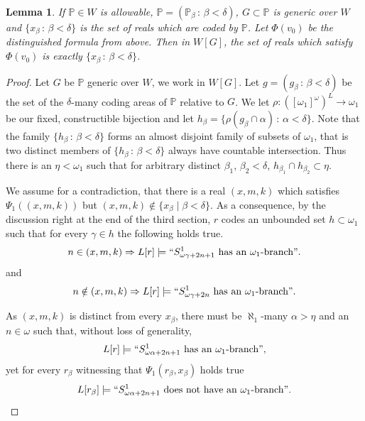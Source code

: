 \documentclass[a4paper,11pt]{article}
\newtheorem{lemma}[theorem]{Lemma}
\newcommand{\forceP}{\mathbb{P}}
\begin{document}
\begin{lemma}\label{nounwantedcodes}
If $\forceP \in W$ is allowable, $\forceP=(\forceP_{\beta} \, : \, \beta < \delta)$, $G \subset \forceP$ is generic over $W$ and $\{ x_{\beta} \, : \, \beta < \delta\}$ is the set of reals which are coded by $\forceP$. Let $\Phi(v_0)$ be the distinguished formula from above. Then
in $W[G]$, the set of reals which satisfy $\Phi(v_0)$ is exactly 
$\{ x_{\beta} \, : \, \beta < \delta\}$.
\end{lemma}
\begin{proof}
Let $G$ be $\forceP$ generic over $W$, we work in $W[G]$. Let $g= (g_{\beta} \, : \, {\beta} < \delta)$ be the set of the $\delta$-many coding areas of $\forceP$ relative to $G$. We let $\rho : ([\omega_1]^{\omega})^L \rightarrow \omega_1$ be our fixed, constructible bijection and let $h_{\beta}= \{ \rho (g_{\beta} \cap \alpha) \, : \, \alpha < \delta\}$. Note that the family $\{h_{\beta} \,: \, \beta < \delta \}$ forms an almost disjoint family of subsets of $\omega_1$, that is two distinct members of  $\{h_{\beta} \,: \, \beta < \delta \}$ always have countable intersection. Thus there is an $\eta < \omega_1$ such that for arbitrary distinct $\beta_1$, $\beta_2 < \delta$,  $h_{\beta_1}\cap h_{\beta_2} \subset \eta$.  
 

We assume for a contradiction, that there is a real $(x,m,k)$ which satisfies $\Psi_1 ((x,m,k))$ but $(x,m,k) \notin \{x_{\beta} \mid \beta < \delta \}$.
As a consequence, by the discussion right at the end of the third section, $r$ codes an unbounded set $h \subset \omega_1$ such that for every $\gamma \in h$ the following holds true.
\begin{align*}
n \in (x,m,k) \Rightarrow L[r] \models  ``S^1_{\omega \gamma + 2n+1} \text{ has an $\omega_1$-branch}".
\end{align*}
and
\begin{align*}
n \notin (x,m,k) \Rightarrow L[r] \models ``S^1_{\omega \gamma + 2n} \text{ has an $\omega_1$-branch}".
\end{align*}


As $(x,m,k)$ is distinct from every $x_{\beta}$, there must be $\aleph_1$-many $\alpha > \eta$ and an $n \in \omega$ such that, without loss of generality,
\[L[r] \models ``S^1_{\omega \alpha + 2n+1} \text{ has an $\omega_1$-branch}",\]
yet for every $r_{\beta}$ witnessing that $\Psi_1(r_{\beta}, x_{\beta})$ holds true
\[L[r_{\beta}] \models  ``S^1_{\omega \alpha + 2n+1} \text{ does not have an $\omega_1$-branch}".\]


\end{proof}
\end{document}

